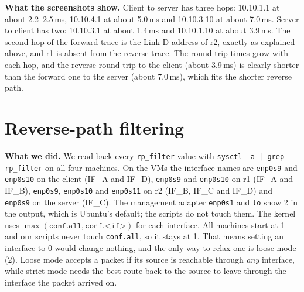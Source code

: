 \documentclass[10pt,a4paper]{article}
\newcommand{\cmd}[1]{\texttt{#1}}
\begin{document}
\begin{aside}
\textbf{What the screenshots show.}
Client to server has three hops: 10.10.1.1 at about 2.2--2.5\,ms, 10.10.4.1 at about 5.0\,ms and
10.10.3.10 at about 7.0\,ms. Server to client has two: 10.10.3.1 at about 1.4\,ms and 10.10.1.10 at about
3.9\,ms. The second hop of the forward trace is the Link D address of r2, exactly as explained above, and
r1 is absent from the reverse trace. The round-trip times grow with each hop, and the reverse round
trip to the client (about 3.9\,ms) is clearly shorter than the forward one to the server (about 7.0\,ms),
which fits the shorter reverse path.
\end{aside}


\section{Reverse-path filtering}

\textbf{What we did.} We read back every \cmd{rp\_filter} value with
\cmd{sysctl -a | grep rp\_filter} on all four machines. On the VMs the interface names are
\cmd{enp0s9} and \cmd{enp0s10} on the client (IF\_A and IF\_D), \cmd{enp0s9} and \cmd{enp0s10}
on r1 (IF\_A and IF\_B), \cmd{enp0s9}, \cmd{enp0s10} and \cmd{enp0s11} on r2 (IF\_B, IF\_C and
IF\_D) and \cmd{enp0s9} on the server (IF\_C). The management adapter \cmd{enp0s1} and \cmd{lo}
show 2 in the output, which is Ubuntu's default; the scripts do not touch them. The kernel uses
$\max(\cmd{conf.all}, \cmd{conf.<if>})$ for each interface. All machines start at 1 and our
scripts never touch \cmd{conf.all}, so it stays at 1. That means setting an interface to 0
would change nothing, and the only way to relax one is loose mode (2). Loose mode accepts a
packet if its source is reachable through \emph{any} interface, while strict mode needs the best
route back to the source to leave through the interface the packet arrived on.
\end{document}
